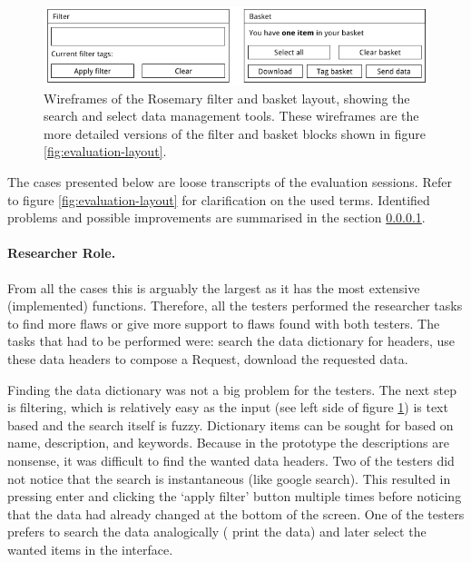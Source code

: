 
\begin{figure}[th]
	\centering
	\includegraphics[width=1.0\linewidth]{images/evaluation-basket-layout}
	\caption{
		Wireframes of the Rosemary filter and basket layout, showing the search and select data management tools.
		These wireframes are the more detailed versions of the filter and basket blocks shown in figure \ref{fig:evaluation-layout}.
	}
	\label{fig:evaluation-basket-layout}
\end{figure}


The  cases presented below are loose transcripts of the evaluation sessions.
Refer to figure \ref{fig:evaluation-layout} for clarification on the used terms.
Identified problems and possible improvements are summarised in the  section \ref{}.

\paragraph{Researcher Role.}
From all the cases this is arguably the largest as it has the most extensive (implemented) functions.
Therefore, all the testers performed the researcher tasks to find more flaws or give more support to flaws found with both testers.
The tasks that had to be performed were: search the data dictionary for headers, use these data headers to compose a Request, download the requested data. 


Finding the data dictionary was not a big problem for the testers.
The next step is filtering, which is relatively easy as the input (see left side of figure \ref{fig:evaluation-basket-layout}) is text based and the search itself is fuzzy.
Dictionary items can be sought for based on name, description, and keywords.
Because in the prototype the descriptions are nonsense, it was difficult to find the wanted data headers.
Two of the testers did not notice that the search is instantaneous (like google search).
This resulted in pressing enter and clicking the `apply filter' button multiple times before noticing that the data had already changed at the bottom of the screen.
One of the testers prefers to search the data analogically (\ie{} print the data) and later select the wanted items in the interface.

